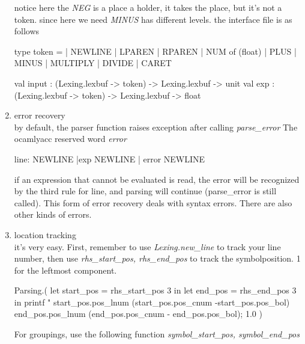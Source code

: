 \begin{enumerate}
  notice here the \textit{NEG} is a place a holder, it takes the
  place, but it's not a token. since here we need \textit{MINUS} has
  different levels. the interface file is as follows

  \begin{bluetext}
type token =
  | NEWLINE
  | LPAREN
  | RPAREN
  | NUM of (float)
  | PLUS
  | MINUS
  | MULTIPLY
  | DIVIDE
  | CARET

val input :
  (Lexing.lexbuf  -> token) -> Lexing.lexbuf -> unit
val exp :
  (Lexing.lexbuf  -> token) -> Lexing.lexbuf -> float
  \end{bluetext}
  
\item error recovery \\
  by default, the parser function raises exception after calling \textit{parse\_error}
  The ocamlyacc reserved word \textit{error}

  \begin{bluetext}
    line: NEWLINE |exp NEWLINE | error NEWLINE {}
  \end{bluetext}
  if an expression that cannot be evaluated is read, the error will be
  recognized by the third rule for line, and parsing will continue
  (parse\_error is still called). This form of error recovery deals
  with syntax errors. There are also other kinds of errors.

\item location tracking \\
  it's very easy. First, remember to use \textit{Lexing.new\_line} to
  track your line number, then use
  \textit{rhs\_start\_pos, rhs\_end\_pos} to track the symbolposition.
  1 for the leftmost component.
\begin{bluetext}
            Parsing.(
              let start_pos = rhs_start_pos 3 in 
              let end_pos = rhs_end_pos 3 in 
              printf "%
                start_pos.pos_lnum (start_pos.pos_cnum -start_pos.pos_bol)
                end_pos.pos_lnum (end_pos.pos_cnum - end_pos.pos_bol); 
              1.0
            )    
\end{bluetext}
For groupings, use the following function \textit{symbol\_start\_pos,
  symbol\_end\_pos}


\end{enumerate}
